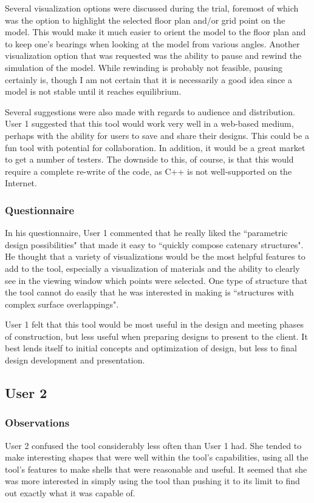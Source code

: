 \documentclass{thesis}
\begin{document}
Several visualization options were discussed during the trial, foremost of which was the option to highlight the selected floor plan
and/or grid point on the model.  This would make it much easier to orient the model to the floor plan and to keep one's bearings
when looking at the model from various angles.  Another visualization option that was requested was the ability to pause and rewind
the simulation of the model.  While rewinding is probably not feasible, pausing certainly is, though I am not certain that it is
necessarily a good idea since a model is not stable until it reaches equilibrium.

Several suggestions were also made with regards to audience and distribution.  User 1 suggested that this tool would work very well in
a web-based medium, perhaps with the ability for users to save and share their designs.  This could be a fun tool with potential for
collaboration.  In addition, it would be a great market to get a number of testers.  The downside to this, of course, is that this
would require a complete re-write of the code, as C++ is not well-supported on the Internet.

\subsubsection{Questionnaire}
In his questionnaire, User 1 commented that he really liked the ``parametric design possibilities" that made it easy to ``quickly compose
catenary structures".  He thought that a variety of visualizations would be the most helpful features to add to the tool, especially
a visualization of materials and the ability to clearly see in the viewing window which points were selected.  One type of structure
that the tool cannot do easily that he was interested in making is ``structures with complex surface overlappings".

User 1 felt that this tool would be most useful in the design and meeting phases of construction, but less useful when preparing
designs to present to the client.  It best lends itself to initial concepts and optimization of design, but less to final design
development and presentation.

\subsection{User 2}
\subsubsection{Observations}
User 2 confused the tool considerably less often than User 1 had.  She tended to make interesting shapes that were well within the
tool's capabilities, using all the tool's features to make shells that were reasonable and useful.  It seemed that she was more
interested in simply using the tool than pushing it to its limit to find out exactly what it was capable of.
\end{document}
